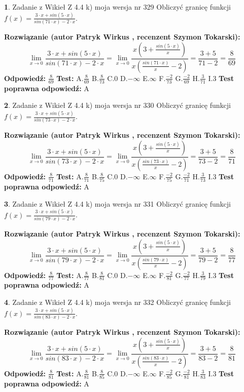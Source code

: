 \documentclass[12pt, a4paper]{article}
\theoremstyle{definition} %
\newtheorem{zad}{}
\newcommand{\zadStart}[1]{\begin{zad}#1\newline}
\newcommand{\zadStop}{\end{zad}}
\newcommand{\rozwStart}[2]{\noindent \textbf{Rozwiązanie (autor #1 , recenzent #2): }\newline}
\newcommand{\rozwStop}{\newline}
\newcommand{\odpStart}{\noindent \textbf{Odpowiedź:}\newline}
\newcommand{\odpStop}{\newline}
\newcommand{\testStart}{\noindent \textbf{Test:}\newline}
\newcommand{\testStop}{\newline}
\newcommand{\kluczStart}{\noindent \textbf{Test poprawna odpowiedź:}\newline}
\newcommand{\kluczStop}{\newline}
\begin{document}
\zadStart{Zadanie z Wikieł Z 4.4 k) moja wersja nr 329}
Obliczyć granicę funkcji $f(x)=\frac{3\cdot x +sin(5\cdot x)}{sin(71\cdot x) -2\cdot x}$.
\zadStop
\rozwStart{Patryk Wirkus}{Szymon Tokarski}
$$\lim\limits_{x\to 0}\frac{3\cdot x +sin(5\cdot x)}{sin(71\cdot x) -2\cdot x}
=\lim\limits_{x\to 0}\frac{x(3+\frac{sin(5\cdot x)}{x})}{x(\frac{sin(71\cdot x)}{x}-2)}
=\frac{3+5}{71-2} = \frac{8}{69}$$
\rozwStop
\odpStart
$\frac{8}{69}$
\odpStop
\testStart
A.$\frac{8}{69}$
B.$\frac{8}{73}$
C.$0$
D.$-\infty$
E.$\infty$
F.$\frac{-2}{73}$
G.$\frac{-2}{69}$
H.$\frac{3}{71}$
I.$3$
\testStop
\kluczStart
A
\kluczStop



\zadStart{Zadanie z Wikieł Z 4.4 k) moja wersja nr 330}
Obliczyć granicę funkcji $f(x)=\frac{3\cdot x +sin(5\cdot x)}{sin(73\cdot x) -2\cdot x}$.
\zadStop
\rozwStart{Patryk Wirkus}{Szymon Tokarski}
$$\lim\limits_{x\to 0}\frac{3\cdot x +sin(5\cdot x)}{sin(73\cdot x) -2\cdot x}
=\lim\limits_{x\to 0}\frac{x(3+\frac{sin(5\cdot x)}{x})}{x(\frac{sin(73\cdot x)}{x}-2)}
=\frac{3+5}{73-2} = \frac{8}{71}$$
\rozwStop
\odpStart
$\frac{8}{71}$
\odpStop
\testStart
A.$\frac{8}{71}$
B.$\frac{8}{75}$
C.$0$
D.$-\infty$
E.$\infty$
F.$\frac{-2}{75}$
G.$\frac{-2}{71}$
H.$\frac{3}{73}$
I.$3$
\testStop
\kluczStart
A
\kluczStop



\zadStart{Zadanie z Wikieł Z 4.4 k) moja wersja nr 331}
Obliczyć granicę funkcji $f(x)=\frac{3\cdot x +sin(5\cdot x)}{sin(79\cdot x) -2\cdot x}$.
\zadStop
\rozwStart{Patryk Wirkus}{Szymon Tokarski}
$$\lim\limits_{x\to 0}\frac{3\cdot x +sin(5\cdot x)}{sin(79\cdot x) -2\cdot x}
=\lim\limits_{x\to 0}\frac{x(3+\frac{sin(5\cdot x)}{x})}{x(\frac{sin(79\cdot x)}{x}-2)}
=\frac{3+5}{79-2} = \frac{8}{77}$$
\rozwStop
\odpStart
$\frac{8}{77}$
\odpStop
\testStart
A.$\frac{8}{77}$
B.$\frac{8}{81}$
C.$0$
D.$-\infty$
E.$\infty$
F.$\frac{-2}{81}$
G.$\frac{-2}{77}$
H.$\frac{3}{79}$
I.$3$
\testStop
\kluczStart
A
\kluczStop



\zadStart{Zadanie z Wikieł Z 4.4 k) moja wersja nr 332}
Obliczyć granicę funkcji $f(x)=\frac{3\cdot x +sin(5\cdot x)}{sin(83\cdot x) -2\cdot x}$.
\zadStop
\rozwStart{Patryk Wirkus}{Szymon Tokarski}
$$\lim\limits_{x\to 0}\frac{3\cdot x +sin(5\cdot x)}{sin(83\cdot x) -2\cdot x}
=\lim\limits_{x\to 0}\frac{x(3+\frac{sin(5\cdot x)}{x})}{x(\frac{sin(83\cdot x)}{x}-2)}
=\frac{3+5}{83-2} = \frac{8}{81}$$
\rozwStop
\odpStart
$\frac{8}{81}$
\odpStop
\testStart
A.$\frac{8}{81}$
B.$\frac{8}{85}$
C.$0$
D.$-\infty$
E.$\infty$
F.$\frac{-2}{85}$
G.$\frac{-2}{81}$
H.$\frac{3}{83}$
I.$3$
\testStop
\kluczStart
A
\kluczStop
\end{document}
